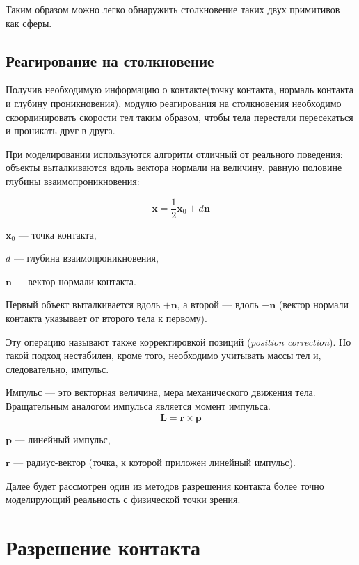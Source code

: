 Таким образом можно легко обнаружить столкновение таких двух примитивов как сферы.
\subsection{Реагирование на столкновение}
Получив необходимую информацию о контакте(точку контакта, нормаль контакта и глубину проникновения), модулю реагирования
на столкновения необходимо скоординировать скорости тел таким образом, чтобы тела перестали пересекаться и проникать друг в друга.  

При моделировании используются алгоритм отличный от реального поведения: объекты выталкиваются вдоль вектора нормали на величину,
равную половине глубины взаимопроникновения:

\begin{equation}
\mathbf{x} = \frac{1}{2}\mathbf{x}_0 + d\mathbf{n}
\end{equation}
\begin{eqrem}
$\mathbf{x}_0$ --- точка контакта,

$d$ --- глубина взаимопроникновения,

$\mathbf{n}$ --- вектор нормали контакта.
\end{eqrem}

Первый объект выталкивается вдоль $+\mathbf{n}$, а второй --- вдоль $-\mathbf{n}$ (вектор нормали контакта указывает от второго тела к первому).

Эту операцию называют также корректировкой позиций (\textit{position correction}). Но такой подход нестабилен, кроме того,
необходимо учитывать массы тел и, следовательно, импульс.

Импульс --- это векторная величина, мера механического движения тела. Вращательным аналогом импульса является момент импульса.
\begin{equation}
\mathbf{L} = \mathbf{r}\times\mathbf{p}
\end{equation}
\begin{eqrem}
$\mathbf{p}$ --- линейный импульс,

$\mathbf{r}$ --- радиус-вектор (точка, к которой приложен линейный импульс).
\end{eqrem}


Далее будет рассмотрен один из методов разрешения контакта более точно моделирующий реальность с физической точки зрения.

\section{Разрешение контакта}

